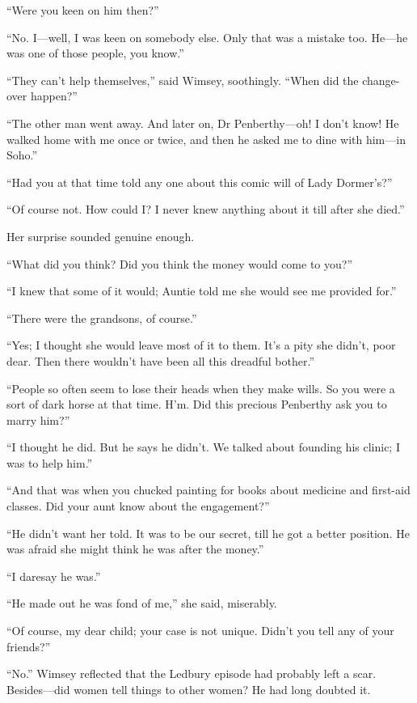 \enquote{Were you keen on him then?}

\enquote{No. I\allowbreak---\allowbreak well, I was keen on somebody else. Only that was a mistake too. He\allowbreak---\allowbreak he was one of those people, you know.}

\enquote{They can't help themselves,} said Wimsey, soothingly. \enquote{When did the change-over happen?}

\enquote{The other man went away. And later on, Dr Penberthy\allowbreak---\allowbreak oh! I don't know! He walked home with me once or twice, and then he asked me to dine with him\allowbreak---\allowbreak in Soho.}

\enquote{Had you at that time told any one about this comic will of Lady Dormer's?}

\enquote{Of course not. How could I? I never knew anything about it till after she died.}

Her surprise sounded genuine enough.

\enquote{What did you think? Did you think the money would come to you?}

\enquote{I knew that some of it would; Auntie told me she would see me provided for.}

\enquote{There were the grandsons, of course.}

\enquote{Yes; I thought she would leave most of it to them. It's a pity she didn't, poor dear. Then there wouldn't have been all this dreadful bother.}

\enquote{People so often seem to lose their heads when they make wills. So you were a sort of dark horse at that time. H'm. Did this precious Penberthy ask you to marry him?}

\enquote{I thought he did. But he says he didn't. We talked about founding his clinic; I was to help him.}

\enquote{And that was when you chucked painting for books about medicine and first-aid classes. Did your aunt know about the engagement?}

\enquote{He didn't want her told. It was to be our secret, till he got a better position. He was afraid she might think he was after the money.}

\enquote{I daresay he was.}

\enquote{He made out he was fond of me,} she said, miserably.

\enquote{Of course, my dear child; your case is not unique. Didn't you tell any of your friends?}

\enquote{No.} Wimsey reflected that the Ledbury episode had probably left a scar. Besides\allowbreak---\allowbreak did women tell things to other women? He had long doubted it.

